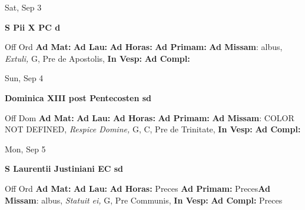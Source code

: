 \documentclass[10pt]{memoir}
\begin{document}
\begin{center}
\begin{minipage}{3.5in}
\vspace{2em}
\begin{center}Sat, Sep 3
\end{center}
\textbf{ \large S Pii X PC
\textnormal{\normalsize d}}

\begin{justify}Off Ord
\textbf{Ad Mat: }
\textbf{Ad Lau: }
\textbf{Ad Horas: }
\textbf{Ad Primam: }\textbf{Ad Missam}: albus, \textit{Extuli,} G, Pre de Apostolis, 
\textbf{In Vesp: }
\textbf{Ad Compl: }
\end{justify}
\end{minipage}
\end{center}

\begin{center}
\begin{minipage}{3.5in}
\vspace{2em}
\begin{center}Sun, Sep 4
\end{center}
\textbf{ \large Dominica XIII post Pentecosten
\textnormal{\normalsize sd}}

\begin{justify}Off Dom
\textbf{Ad Mat: }
\textbf{Ad Lau: }
\textbf{Ad Horas: }
\textbf{Ad Primam: }\textbf{Ad Missam}: COLOR NOT DEFINED, \textit{Respice Domine,} G, C, Pre de Trinitate, 
\textbf{In Vesp: }
\textbf{Ad Compl: }
\end{justify}
\end{minipage}
\end{center}

\begin{center}
\begin{minipage}{3.5in}
\vspace{2em}
\begin{center}Mon, Sep 5
\end{center}
\textbf{ \large S Laurentii Justiniani EC
\textnormal{\normalsize sd}}

\begin{justify}Off Ord
\textbf{Ad Mat: }
\textbf{Ad Lau: }
\textbf{Ad Horas: }Preces
\textbf{Ad Primam: }Preces\textbf{Ad Missam}: albus, \textit{Statuit ei,} G, Pre Communis, 
\textbf{In Vesp: }
\textbf{Ad Compl: }Preces
\end{justify}
\end{minipage}
\end{center}
\end{document}
